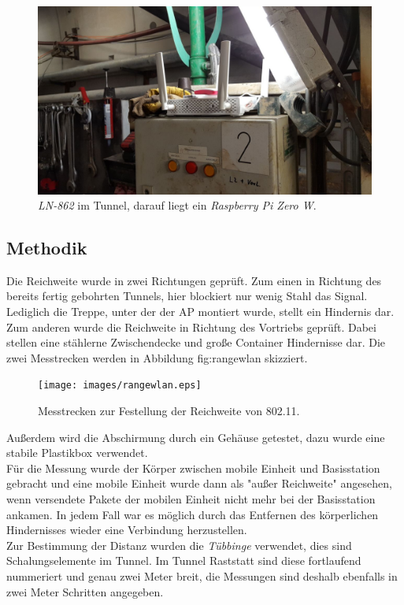 \begin{figure}[h]
  \centering
	\includegraphics[width=\textwidth]{images/applacement.jpg}
  \caption{\emph{LN-862} im Tunnel, darauf liegt ein \emph{Raspberry Pi Zero W}.}
  \label{fig:applacement}
\end{figure}

\subsection{Methodik}
Die Reichweite wurde in zwei Richtungen geprüft.
Zum einen in Richtung des bereits fertig gebohrten Tunnels, hier blockiert nur wenig Stahl das Signal. 
Lediglich die Treppe, unter der der AP montiert wurde, stellt ein Hindernis dar.
Zum anderen wurde die Reichweite in Richtung des Vortriebs geprüft.
Dabei stellen eine stählerne Zwischendecke und große Container Hindernisse dar.
Die zwei Messtrecken werden in Abbildung {fig:rangewlan} skizziert.

\begin{figure}[h!]
  \centering
	\texttt{[image: images/rangewlan.eps]}
  \caption{Messtrecken zur Festellung der Reichweite von 802.11.}
  \label{fig:rangewlan}
\end{figure}

Außerdem wird die Abschirmung durch ein Gehäuse getestet, dazu wurde eine stabile Plastikbox verwendet.\\
Für die Messung wurde der Körper zwischen mobile Einheit und Basisstation gebracht und eine mobile Einheit wurde dann als "{}außer Reichweite"{} angesehen, wenn versendete Pakete der mobilen Einheit nicht mehr bei der Basisstation ankamen.
In jedem Fall war es möglich durch das Entfernen des körperlichen Hindernisses wieder eine Verbindung herzustellen.\\
Zur Bestimmung der Distanz wurden die \emph{Tübbinge} verwendet, dies sind Schalungselemente im Tunnel.
Im Tunnel Raststatt sind diese fortlaufend nummeriert und genau zwei Meter breit, die Messungen sind deshalb ebenfalls in zwei Meter Schritten angegeben.

